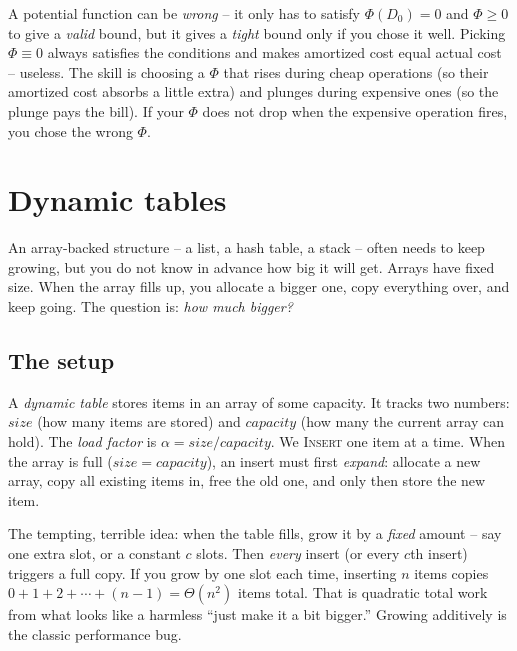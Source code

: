 \begin{trapbox}
A potential function can be \emph{wrong} -- it only has to satisfy
$\Phi(D_0) = 0$ and $\Phi \ge 0$ to give a \emph{valid} bound, but it gives a
\emph{tight} bound only if you chose it well. Picking $\Phi \equiv 0$ always
satisfies the conditions and makes amortized cost equal actual cost -- useless. The
skill is choosing a $\Phi$ that rises during cheap operations (so their amortized
cost absorbs a little extra) and plunges during expensive ones (so the plunge pays
the bill). If your $\Phi$ does not drop when the expensive operation fires, you
chose the wrong $\Phi$.
\end{trapbox}

\section{Dynamic tables}

An array-backed structure -- a list, a hash table, a stack -- often needs to keep growing, but you do not know in advance how big it will
get. Arrays have fixed size. When the array fills up, you allocate a bigger one, copy everything over, and keep going. The question is:
\emph{how much bigger?}

\subsection{The setup}

A \emph{dynamic table} stores items in an array of some capacity. It tracks two
numbers: $\mathit{size}$ (how many items are stored) and $\mathit{capacity}$ (how
many the current array can hold). The \emph{load factor} is
$\alpha = \mathit{size} / \mathit{capacity}$. We \textsc{Insert} one item at a
time. When the array is full ($\mathit{size} = \mathit{capacity}$), an insert must
first \emph{expand}: allocate a new array, copy all existing items in, free the
old one, and only then store the new item.

\begin{trapbox}
The tempting, terrible idea: when the table fills, grow it by a \emph{fixed} amount
-- say one extra slot, or a constant $c$ slots. Then \emph{every} insert (or every
$c$th insert) triggers a full copy. If you grow by one slot each time, inserting
$n$ items copies $0 + 1 + 2 + \cdots + (n-1) = \Theta(n^2)$ items total. That is
quadratic total work from what looks like a harmless ``just make it a bit
bigger.'' Growing additively is the classic performance bug.
\end{trapbox}


